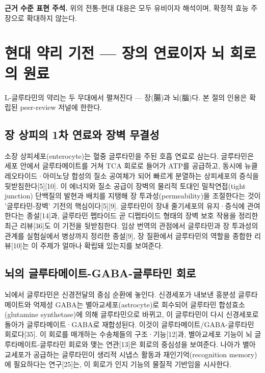 \documentclass[12pt,oneside]{book}
\newenvironment{authnote}
  {\par\smallskip\begingroup\leftskip=6mm\rightskip=3mm\small\color{muted}\noindent\ignorespaces}
  {\par\endgroup\smallskip}
\begin{document}
\begin{authnote}\textbf{근거 수준 표현 주석.} 위의 전통-현대 대응은 모두 유비이자 해석이며, 확정적 효능 주장으로 확대하지 않는다.\end{authnote}

\section{현대 약리 기전 — 장의 연료이자 뇌 회로의 원료}

L-글루타민의 약리는 두 무대에서 펼쳐진다 — 장(腸)과 뇌(腦)다. 본 절의 인용은 확립된 peer-review 저널에 한한다.

\subsection{장 상피의 1차 연료와 장벽 무결성}

소장 상피세포(enterocyte)는 혈중 글루타민을 주된 호흡 연료로 삼는다. 글루타민은 세포 안에서 글루타메이트를 거쳐 TCA 회로로 들어가 ATP를 공급하고, 동시에 뉴클레오타이드·아미노당 합성의 질소 공여체가 되어 빠르게 분열하는 상피세포의 증식을 뒷받침한다[5][10]. 이 에너지와 질소 공급이 장벽의 물리적 토대인 밀착연접(tight junction) 단백질의 발현과 배치를 지탱해 장 투과성(permeability)을 조절한다는 것이 '글루타민-장벽' 기전의 핵심이다[5][9]. 글루타민이 장내 줄기세포의 유지·증식에 관여한다는 종설[14]과, 글루타민 펩타이드 곧 디펩타이드 형태의 장벽 보호 작용을 정리한 최근 리뷰[36]도 이 기전을 뒷받침한다. 임상 번역의 관점에서 글루타민과 장 투과성의 관계를 실험실에서 병상까지 정리한 종설[9], 장 질환에서 글루타민의 역할을 종합한 리뷰[10]는 이 주제가 얼마나 확립돼 있는지를 보여준다.

\subsection{뇌의 글루타메이트-GABA-글루타민 회로}

뇌에서 글루타민은 신경전달의 중심 순환에 놓인다. 신경세포가 내보낸 흥분성 글루타메이트와 억제성 GABA는 별아교세포(astrocyte)로 회수되어 글루타민 합성효소(glutamine synthetase)에 의해 글루타민으로 바뀌고, 이 글루타민이 다시 신경세포로 돌아가 글루타메이트·GABA로 재합성된다. 이것이 글루타메이트/GABA-글루타민 회로다[35]. 이 회로를 매개하는 수송체들의 구조·기능[12]과, 별아교세포 기능이 뇌 글루타메이트-글루타민 회로와 맺는 연관[13]은 회로의 중심성을 보여준다. 나아가 별아교세포가 공급하는 글루타민이 생리적 시냅스 활동과 재인기억(recognition memory)에 필요하다는 연구[25]는, 이 회로가 인지 기능의 물질적 기반임을 시사한다.
\end{document}
